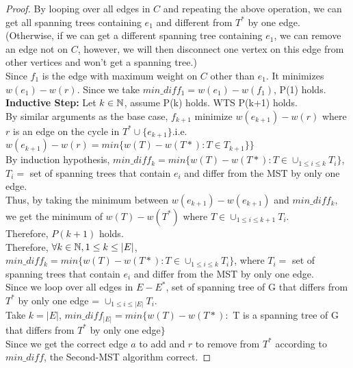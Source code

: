 \documentclass[11pt]{article}
\begin{document}
\begin{enumerate}
\begin{proof}
    By looping over all edges in $C$ and repeating the above operation, we can get all spanning trees containing $e_1$ and different from $T^*$ by one edge.\\
    (Otherwise, if we can get a different spanning tree containing $e_1$, we can remove an edge not on $C$, however, we will then disconnect one vertex on this edge from other vertices and won't get a spanning tree.)\\[2ex]
    Since $f_1$ is the edge with maximum weight on $C$ other than $e_1$. It minimizes  $w(e_1) - w(r)$. Since we take $min\_diff_1 = w(e_1) - w(f_1)$, P(1) holds.\\[2ex]
\textbf{Inductive Step: } Let $k\in \mathbb N$, assume P(k) holds. WTS P(k+1) holds.\\
By similar arguments as the base case, $f_{k+1}$ minimize $w(e_{k+1}) - w(r)$ where $r$ is an edge on the cycle in $T^{*} \cup \{e_{k+1}\}$.i.e. $w(e_{k+1}) - w(r) = min\{w(T) - w(T*): T \in T_{k+1}\}\}$\\
By induction hypothesis, $min\_diff_{k} = min\{w(T) - w(T*): T \in \cup_{1\leq i \leq k} T_i\}$, $T_i =$ set of spanning trees that contain $e_i$ and differ from the MST by only one edge.\\
Thus, by taking the minimum between $w(e_{k+1}) - w(e_{k+1})$ and $min\_diff_{k}$, we get the minimum of $w(T) - w(T^*)$ where $ T \in \cup_{1\leq i \leq k+1} T_i$.\\
Therefore, $P(k+1)$ holds.\\

Therefore, $\forall k \in \mathbb N, 1 \leq k \leq |E|$, $min\_diff_{k} = min\{w(T) - w(T*): T \in \cup_{1\leq i \leq k} T_i\}$, where $T_i =$ set of spanning trees that contain $e_i$ and differ from the MST by only one edge.\\[2ex]
Since we loop over all edges in $E - E^*$, set of spanning tree of G that differs from $T^*$ by only one edge = $\cup_{1\leq i \leq |E|} T_i$.\\
Take $k = |E|$, $min\_diff_{|E|} = min\{w(T) - w(T*):$ T is a spanning tree of G that differs from $T^*$ by only one edge$\}$ \\
Since we get the correct edge $a$ to add and $r$ to remove from $T^*$ according to $min\_diff$, the Second-MST algorithm correct.
\end{proof}


\end{enumerate}
\end{document}
